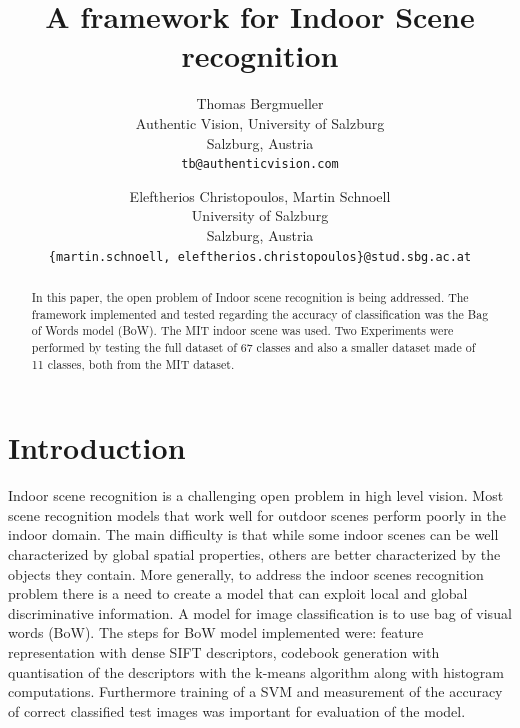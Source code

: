 \documentclass[10pt,twocolumn,letterpaper]{article}
\begin{document}
\title{A framework for Indoor Scene recognition}

\author{Thomas Bergmueller\\
Authentic Vision, University of Salzburg\\
Salzburg, Austria\\
{\tt\small tb@authenticvision.com}
\and
Eleftherios Christopoulos, Martin Schnoell\\
University of Salzburg\\
Salzburg, Austria\\
{\tt\small \{martin.schnoell, eleftherios.christopoulos\}@stud.sbg.ac.at}
}

\maketitle
\thispagestyle{empty}

\begin{abstract}
   In this paper, the open problem of Indoor scene recognition is being addressed. The framework implemented and tested regarding the accuracy of classification was the Bag of Words model (BoW). The MIT indoor scene was used. Two Experiments were performed by testing the full dataset of 67 classes and also a smaller dataset made of 11 classes, both from the MIT dataset.   
\end{abstract}

\section{Introduction}
Indoor scene recognition is a challenging open problem in high level vision. Most scene recognition models that work well for outdoor scenes perform poorly in the indoor domain. The main difficulty is that while some indoor scenes can be well characterized by global spatial properties, others are better characterized by the objects they contain. More generally, to address the indoor scenes recognition problem there is a need to create a model that can exploit local and global discriminative information.\cite{indoorScenes} A model for image classification is to use bag of visual words (BoW). The steps for BoW model implemented were: feature representation with dense SIFT descriptors, codebook generation with quantisation of the descriptors with the k-means algorithm along with histogram computations. Furthermore training of a SVM and measurement of  the accuracy of correct classified test images was important for evaluation of the model.
\end{document}
